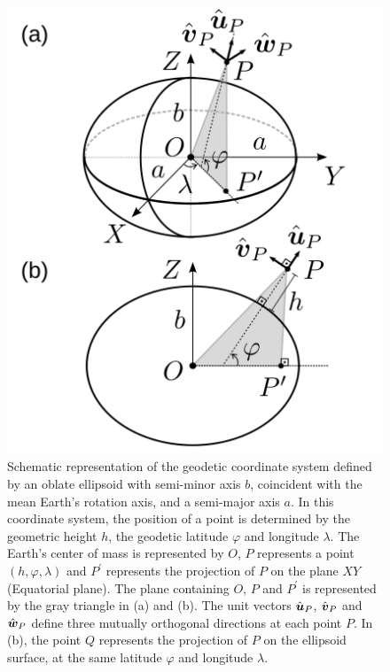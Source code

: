 \documentclass[extra]{gji}
\begin{document}
\begin{figure}
    \includegraphics{figures/cartesian-geodetic-systems.png}
    \caption{Schematic representation of the geodetic coordinate
    system defined by an oblate ellipsoid with semi-minor axis $b$, 
    coincident with the mean Earth's rotation axis, and a semi-major
    axis $a$. In this coordinate system, the position of a point is
    determined by the geometric height $h$, the geodetic latitude 
    $\varphi$ and longitude $\lambda$. 
    The Earth's center of mass is represented 
    by $O$, $P$ represents a point $(h, \varphi, \lambda)$ and 
    $P^{\prime}$ represents the projection of $P$ on the plane $XY$ 
    (Equatorial plane). The plane containing $O$, $P$ and 
    $P^{\prime}$ is represented by the gray triangle in (a) and (b). 
    The unit vectors 
    $\hat{\mitbf{u}}_{P}$, $\hat{\mitbf{v}}_{P}$ and 
    $\hat{\mitbf{w}}_{P}$ define three mutually orthogonal 
    directions at each point $P$.
    In (b), the point $Q$ represents the projection of $P$ on the 
    ellipsoid surface, at the same latitude $\varphi$ and 
    longitude $\lambda$.}
  \label{fig:fig1}
\end{figure}
\end{document}
